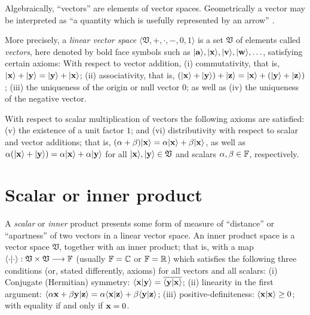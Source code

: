 Algebraically, ``vectors'' are elements of vector spaces.
Geometrically a vector may be interpreted as ``a quantity which is usefully represented by an arrow'' \cite{Weinreich}.

More precisely, a {\em linear vector space}      $\langle  \mathfrak V , +, \cdot , -,  0, 1\rangle$
is a set $\mathfrak V$ of elements called {\em vectors},
here denoted by  bold face  symbols such as
$
\vert {\bf a}\rangle,
\vert {\bf x}\rangle,
\vert {\bf v}\rangle,
\vert {\bf w}\rangle,
\ldots
$,
satisfying certain   axioms:
With respect to vector addition,
(i)
commutativity, that is, $\vert {\bf x}\rangle + \vert {\bf y}\rangle   = \vert {\bf y}\rangle + \vert {\bf x}\rangle$;
(ii)
associativity, that is, $(\vert {\bf x}\rangle + \vert {\bf y}\rangle ) +  \vert {\bf z}\rangle =\vert {\bf x}\rangle + (\vert {\bf y}\rangle +  \vert {\bf z}\rangle )$;
(iii)
the uniqueness of the origin or null vector $0$;
as well as
(iv)
the uniqueness of  the negative vector.

With respect to scalar multiplication of vectors the following axioms are satisfied:
(v)
the existence of a unit factor $1$; and
(vi)
distributivity with respect to scalar and vector additions; that is,
$
(\alpha +\beta )\vert {\bf x} \rangle = \alpha \vert  {\bf x} \rangle + \beta  \vert  {\bf x} \rangle$,
as well as
$
\alpha (\vert {\bf x} \rangle +\vert {\bf y} \rangle ) = \alpha\vert  {\bf x} \rangle +\alpha\vert  {\bf y} \rangle$
for all
$\vert {\bf x} \rangle , \vert {\bf y} \rangle  \in \mathfrak V$ and scalars $\alpha ,\beta \in  {\Bbb F}$,
respectively.



\section{Scalar or inner product}
\label{2011-m-scalarproduct}

A {\em scalar} or {\em inner} product presents some form of measure of ``distance'' or ``apartness''
of two vectors in a linear vector space.
An inner product space is a vector space $\mathfrak V$,
together with an inner product; that is, with a map
 $\langle \cdot \vert \cdot \rangle :  \mathfrak V  \times  \mathfrak V  \longrightarrow {\Bbb F}$
 (usually ${\Bbb F}={\Bbb C}$ or ${\Bbb F}={\Bbb R}$)
which satisfies the following three conditions (or, stated differently, axioms) for all vectors  and all scalars:
(i)
Conjugate (Hermitian) symmetry:
$
\langle {\bf x}\vert {\bf y}\rangle
=
\overline{\langle {\bf y}\vert {\bf x}\rangle }$;
(ii)
linearity in the first argument:
$
\langle  \alpha{\bf x} + \beta {\bf y}  \vert {\bf z}\rangle
=
\alpha {\langle {\bf x}\vert {\bf z}\rangle}
+
\beta {\langle {\bf y}\vert {\bf z}\rangle}
$;
(iii)
positive-definiteness:
$
\langle {\bf x}\vert {\bf x}\rangle
\ge
0$;  with equality if and only if ${\bf x} = 0$.


